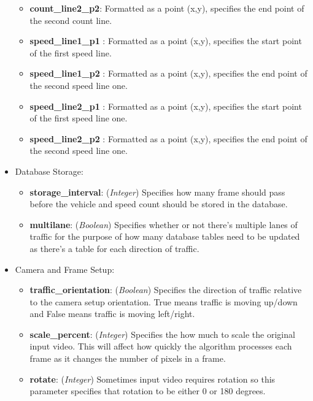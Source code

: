 \begin{itemize}
\begin{itemize}
        \item\textbf{count\_line2\_p2}: Formatted as a point (x,y), specifies the end point of the second count line.
        \item\textbf{speed\_line1\_p1 }: Formatted as a point (x,y), specifies the start point of the first speed line.
        \item\textbf{speed\_line1\_p2 }: Formatted as a point (x,y), specifies the end point of the second speed line one.
        \item\textbf{speed\_line2\_p1 }: Formatted as a point (x,y), specifies the start point of the first speed line one.
        \item\textbf{speed\_line2\_p2 }: Formatted as a point (x,y), specifies the end point of the second speed line one.
    \end{itemize}

\item Database Storage:
    \begin{itemize}
        \item\textbf{storage\_interval}: (\emph{Integer}) Specifies how many frame should pass before the vehicle and speed count should be stored in the database.
        \item\textbf{multilane}: (\emph{Boolean}) Specifies whether or not there's multiple lanes of traffic for the purpose of how many database tables need to be updated as there's a table for each direction of traffic. 
    \end{itemize} 

\item Camera and Frame Setup:
    \begin{itemize}
        \item\textbf{traffic\_orientation}: (\emph{Boolean}) Specifies the direction of traffic relative to the camera setup orientation. True means traffic is moving up/down and False means traffic is moving left/right. 
        \item\textbf{scale\_percent}: (\emph{Integer}) Specifies the how much to scale the original input video. This will affect how quickly the algorithm processes each frame as it changes the number of pixels in a frame.
        \item\textbf{rotate}: (\emph{Integer}) Sometimes input video requires rotation so this parameter specifies that rotation to be either 0 or 180 degrees.
    \end{itemize} 


\end{itemize}
